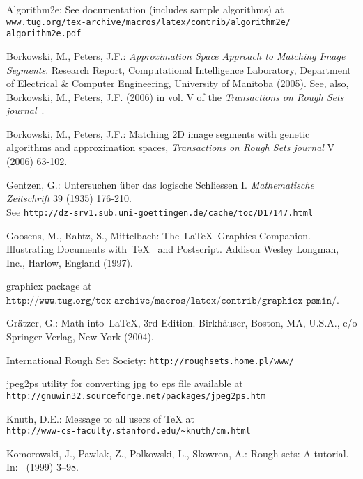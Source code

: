 \documentclass{llncs}
\begin{document}
\begin{thebibliography}{99}\label{refs}

 Algorithm2e: See documentation (includes sample algorithms) at\\
\texttt{www.tug.org/tex-archive/macros/latex/contrib/algorithm2e/}\\
\texttt{algorithm2e.pdf}

 Borkowski, M., Peters, J.F.: \emph{Approximation Space Approach to Matching Image Segments}. Research Report, Computational Intelligence Laboratory, Department of Electrical \& Computer Engineering, University of Manitoba (2005).  See, also, Borkowski, M., Peters, J.F. (2006) in vol. V of the \emph{Transactions on Rough Sets journal}~\cite{2D}.

 Borkowski, M., Peters, J.F.: Matching 2D image segments with genetic algorithms and approximation spaces, \emph{Transactions on Rough Sets journal} V (2006) 63-102.

 Gentzen, G.: Untersuchen \"{u}ber das logische Schliessen I.  {\it Mathematische Zeitschrift} 39 (1935) 176-210.\\
See \texttt{http://dz-srv1.sub.uni-goettingen.de/cache/toc/D17147.html}

 Goosens, M., Rahtz, S., Mittelbach: The~\LaTeX~Graphics Companion. Illustrating Documents with~\TeX~ and Postscript.  Addison Wesley Longman, Inc., Harlow, England (1997).

 graphicx package at\\
$\texttt{http://www.tug.org/tex-archive/macros/latex/contrib/graphicx-psmin/}$.

 Gr\"{a}tzer, G.: Math into~\LaTeX, 3rd Edition. Birkh\"{a}user, Boston, MA, U.S.A., c/o Springer-Verlag, New York (2004).

 International Rough Set Society: \texttt{http://roughsets.home.pl/www/}

 jpeg2ps utility for converting jpg to eps file available at\\
\texttt{http://gnuwin32.sourceforge.net/packages/jpeg2ps.htm}

 Knuth, D.E.: Message to all users of TeX at\\
\texttt{http://www-cs-faculty.stanford.edu/\~{}knuth/cm.html}

 Komorowski, J., Pawlak, Z., Polkowski, L., Skowron, A.: Rough sets: A tutorial.  In:~\cite{book01} (1999) 3--98.


\end{thebibliography}
\end{document}
